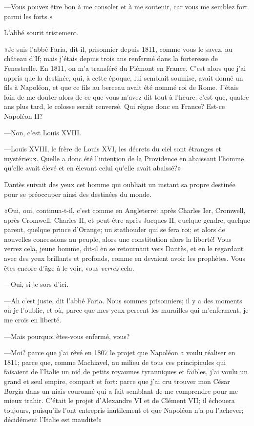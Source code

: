—Vous pouvez être bon à me consoler et à me soutenir, car vous me semblez fort parmi les forts.»

L'abbé sourit tristement.

«Je suis l'abbé Faria, dit-il, prisonnier depuis 1811, comme vous le savez, au château d'If; mais j'étais depuis trois ans renfermé dans la forteresse de Fenestrelle. En 1811, on m'a transféré du Piémont en France. C'est alors que j'ai appris que la destinée, qui, à cette époque, lui semblait soumise, avait donné un fils à Napoléon, et que ce fils au berceau avait été nommé roi de Rome. J'étais loin de me douter alors de ce que vous m'avez dit tout à l'heure: c'est que, quatre ans plus tard, le colosse serait renversé. Qui règne donc en France? Est-ce Napoléon II?

—Non, c'est Louis XVIII.

—Louis XVIII, le frère de Louis XVI, les décrets du ciel sont étranges et mystérieux. Quelle a donc été l'intention de la Providence en abaissant l'homme qu'elle avait élevé et en élevant celui qu'elle avait abaissé?»

Dantès suivait des yeux cet homme qui oubliait un instant sa propre destinée pour se préoccuper ainsi des destinées du monde.

«Oui, oui, continua-t-il, c'est comme en Angleterre: après Charles Ier, Cromwell, après Cromwell, Charles II, et peut-être après Jacques II, quelque gendre, quelque parent, quelque prince d'Orange; un stathouder qui se fera roi; et alors de nouvelles concessions au peuple, alors une constitution alors la liberté! Vous verrez cela, jeune homme, dit-il en se retournant vers Dantès, et en le regardant avec des yeux brillants et profonds, comme en devaient avoir les prophètes. Vous êtes encore d'âge à le voir, vous \textit{verrez} cela.

—Oui, si je sors d'ici.

—Ah c'est juste, dit l'abbé Faria. Nous sommes prisonniers; il y a des moments où je l'oublie, et où, parce que mes yeux percent les murailles qui m'enferment, je me crois en liberté.

—Mais pourquoi êtes-vous enfermé, vous?

—Moi? parce que j'ai rêvé en 1807 le projet que Napoléon a voulu réaliser en 1811; parce que, comme Machiavel, au milieu de tous ces principicules qui faisaient de l'Italie un nid de petits royaumes tyranniques et faibles, j'ai voulu un grand et seul empire, compact et fort: parce que j'ai cru trouver mon César Borgia dans un niais couronné qui a fait semblant de me comprendre pour me mieux trahir. C'était le projet d'Alexandre VI et de Clément VII; il échouera toujours, puisqu'ils l'ont entrepris inutilement et que Napoléon n'a pu l'achever; décidément l'Italie est maudite!»

